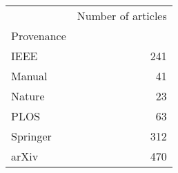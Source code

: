 \begin{tabular}{lr}
\toprule
{} &  Number of articles \\
Provenance &                     \\
\midrule
IEEE       &                 241 \\
Manual     &                  41 \\
Nature     &                  23 \\
PLOS       &                  63 \\
Springer   &                 312 \\
arXiv      &                 470 \\
\bottomrule
\end{tabular}
